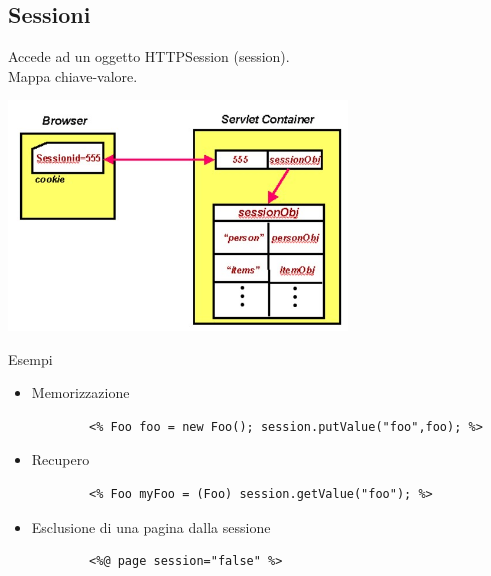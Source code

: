 \begin{itemize}
\subsection{Sessioni}
Accede ad un oggetto HTTPSession (session).
\\Mappa chiave-valore.
\begin{center}
    \includegraphics[width=0.675\textwidth]{img/appWeb21.jpg}
\end{center}
Esempi
\begin{itemize}
    \item Memorizzazione
    \begin{verbatim}
        <% Foo foo = new Foo(); session.putValue("foo",foo); %>
    \end{verbatim}
    \item Recupero
    \begin{verbatim}
        <% Foo myFoo = (Foo) session.getValue("foo"); %>
    \end{verbatim}
    \item Esclusione di una pagina dalla sessione
    \begin{verbatim}
        <%@ page session="false" %>
    \end{verbatim}
\end{itemize}


\end{itemize}
